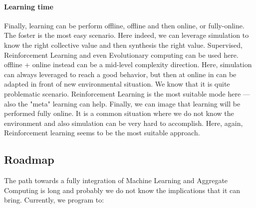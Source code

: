 \documentclass[
  twocolumn,
]{ceurart}
\begin{document}
\paragraph{Learning time}
 Finally, learning can be perform offline, offline and then online, or fully-online.
 The foster is the most easy scenario. Here indeed, we can leverage simulation to know the right 
 collective value and then synthesis the right value. Supervised, Reinforcement Learning and even Evolutionary 
 computing can be used here. offline + online instead can be a mid-level complexity direction.
 Here, simulation can always leveraged to reach a good behavior, but then at online in can be
 adapted in front of new environmental situation. We know that it is quite problematic scenario. Reinforcement 
 Learning is the most suitable mode here --- also the "meta" learning can help.
 Finally, we can image that learning will be performed fully online. It is a common situation where
 we do not know the environment and also simulation can be very hard to accomplish. Here, again, Reinforcement learning
 seems to be the most suitable approach.

 

\subsection{Roadmap}
The path towards a fully integration of Machine Learning and Aggregate Computing is long
 and probably we do not know the implications that it can bring. Currently, we program to:
\end{document}
